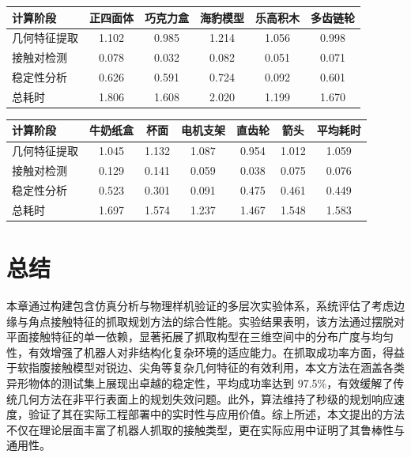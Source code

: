 \begin{table}[htbp]
    \centering
    \small
    \label{tab:computation_time}
    \begin{threeparttable}
    \setlength{\tabcolsep}{12pt}
    \begin{tabular}{lccccc}
        \toprule
        计算阶段 & 正四面体 & 巧克力盒 & 海豹模型 & 乐高积木 & 多齿链轮 \\
        \midrule
        几何特征提取 & 1.102 & 0.985 & 1.214 & 1.056 & 0.998 \\
        接触对检测 & 0.078 & 0.032 & 0.082 & 0.051 & 0.071 \\
        稳定性分析 & 0.626 & 0.591 & 0.724 & 0.092 & 0.601 \\
        总耗时 & 1.806 & 1.608 & 2.020 & 1.199 & 1.670 \\
    \end{tabular}

    \setlength{\tabcolsep}{10.5pt}
    \begin{tabular}{lcccccc}
        \toprule
        计算阶段 & 牛奶纸盒 & 杯面 & 电机支架 & 直齿轮 & 箭头 & 平均耗时 \\
        \midrule
        几何特征提取 & 1.045 & 1.132 & 1.087 & 0.954 & 1.012 & 1.059 \\
        接触对检测 & 0.129 & 0.141 & 0.059 & 0.038 & 0.075 & 0.076 \\
        稳定性分析 & 0.523 & 0.301 & 0.091 & 0.475 & 0.461 & 0.449 \\
        总耗时 & 1.697 & 1.574 & 1.237 & 1.467 & 1.548 & 1.583 \\
        \bottomrule
    \end{tabular}
    \end{threeparttable}
\end{table}

\section{总结}
\label{sec:summary}

本章通过构建包含仿真分析与物理样机验证的多层次实验体系，系统评估了考虑边缘与角点接触特征的抓取规划方法的综合性能。实验结果表明，该方法通过摆脱对平面接触特征的单一依赖，显著拓展了抓取构型在三维空间中的分布广度与均匀性，有效增强了机器人对非结构化复杂环境的适应能力。在抓取成功率方面，得益于软指腹接触模型对锐边、尖角等复杂几何特征的有效利用，本文方法在涵盖各类异形物体的测试集上展现出卓越的稳定性，平均成功率达到 97.5\%，有效缓解了传统几何方法在非平行表面上的规划失效问题。此外，算法维持了秒级的规划响应速度，验证了其在实际工程部署中的实时性与应用价值。综上所述，本文提出的方法不仅在理论层面丰富了机器人抓取的接触类型，更在实际应用中证明了其鲁棒性与通用性。



